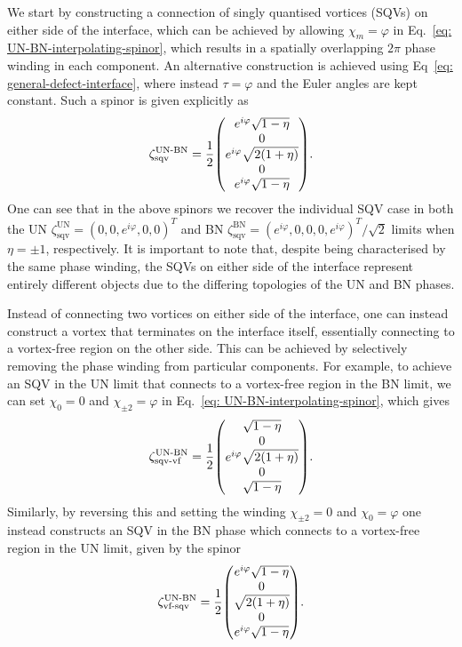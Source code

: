 We start by constructing a connection of singly quantised vortices (SQVs) on
either side of the interface, which can be achieved by allowing
\(\chi_m=\varphi \) in Eq.~\eqref{eq: UN-BN-interpolating-spinor}, which results
in a spatially overlapping \(2\pi \) phase winding in each component.
An alternative construction is achieved using
Eq~\eqref{eq: general-defect-interface}, where instead \(\tau=\varphi \) and the
Euler angles are kept constant.
Such a spinor is given explicitly as
\begin{align}\label{eq: UN-BN-SQV-SQV}
    \zeta_\text{sqv}^\text{UN-BN} =
    \frac{1}{2}\mqty(
        e^{i\varphi}\sqrt{1-\eta} \\
        0 \\
        e^{i\varphi}\sqrt{2(1+\eta)} \\
        0 \\
        e^{i\varphi}\sqrt{1-\eta}
    ).
\end{align}
One can see that in the above spinors we recover the individual SQV case in both
the UN \(\zeta^\text{UN}_\text{sqv} = {(0,0,e^{i\varphi},0,0)}^T\) and BN
\(\zeta^\mathrm{BN}_\text{sqv} ={(e^{i\varphi},0,0,0,e^{i\varphi})}^T/\sqrt{2}\)
limits when \(\eta = \pm 1\), respectively.
It is important to note that, despite being characterised by the same phase
winding, the SQVs on either side of the interface represent entirely different
objects due to the differing topologies of the UN and BN phases.

Instead of connecting two vortices on either side of the interface, one can
instead construct a vortex that terminates on the interface itself, essentially
connecting to a vortex-free region on the other side.
This can be achieved by selectively removing the phase winding from particular
components.
For example, to achieve an SQV in the UN limit that connects to a vortex-free
region in the BN limit, we can set \(\chi_0 = 0\) and \(\chi_{\pm 2}
= \varphi \) in Eq.~\eqref{eq: UN-BN-interpolating-spinor}, which gives
\begin{align}\label{eq: UN-BN-sqv-vf}
    \zeta^\text{UN-BN}_\text{sqv-vf} = \frac{1}{2}\mqty(
        \sqrt{1-\eta} \\
        0 \\
        e^{i\varphi} \sqrt{2(1+\eta)} \\
        0 \\
        \sqrt{1-\eta}
    ).
\end{align}
Similarly, by reversing this and setting the winding \(\chi_{\pm 2} = 0\) and
\(\chi_0=\varphi \) one instead constructs an SQV in the BN phase which connects
to a vortex-free region in the UN limit, given by the spinor
\begin{align}\label{eq: UN-BN-vf-sqv}
    \zeta^\text{UN-BN}_\text{vf-sqv} = \frac{1}{2}\mqty(
        e^{i\varphi} \sqrt{1-\eta} \\
        0 \\
        \sqrt{2(1+\eta)} \\
        0 \\
        e^{i\varphi} \sqrt{1-\eta}
    ).
\end{align}

